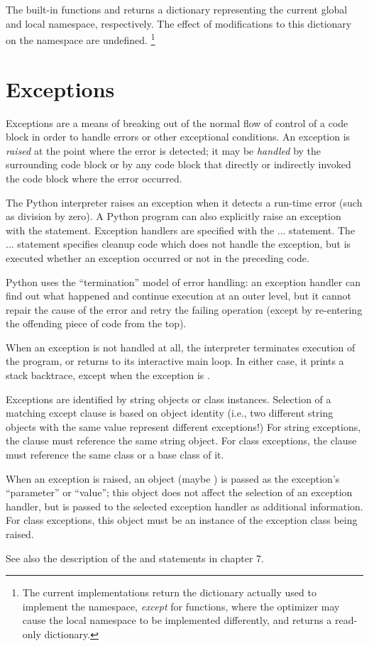 The built-in functions  and  returns a
dictionary representing the current global and local namespace,
respectively.  The effect of modifications to this dictionary on the
namespace are undefined.%
\footnote{The current implementations return the dictionary actually 
used to implement the namespace, \emph{except} for functions, where
the optimizer may cause the local namespace to be implemented
differently, and  returns a read-only dictionary.}

\section{Exceptions}

Exceptions are a means of breaking out of the normal flow of control
of a code block in order to handle errors or other exceptional
conditions.  An exception is \emph{raised} at the point where the error
is detected; it may be \emph{handled} by the surrounding code block or
by any code block that directly or indirectly invoked the code block
where the error occurred.

The Python interpreter raises an exception when it detects a run-time
error (such as division by zero).  A Python program can also
explicitly raise an exception with the  statement.
Exception handlers are specified with the  ... 
statement.  The  ...  statement
specifies cleanup code which does not handle the exception, but is
executed whether an exception occurred or not in the preceding code.

Python uses the ``termination'' model of error handling: an exception
handler can find out what happened and continue execution at an outer
level, but it cannot repair the cause of the error and retry the
failing operation (except by re-entering the offending piece of
code from the top).

When an exception is not handled at all, the interpreter terminates
execution of the program, or returns to its interactive main loop.  In
either case, it prints a stack backtrace, except when the exception is 
.

Exceptions are identified by string objects or class instances.
Selection of a matching except clause is based on object identity
(i.e., two different string objects with the same value represent
different exceptions!)  For string exceptions, the 
clause must reference the same string object.  For class exceptions,
the  clause must reference the same class or a base
class of it.

When an exception is raised, an object (maybe ) is passed
as the exception's ``parameter'' or ``value''; this object does not
affect the selection of an exception handler, but is passed to the
selected exception handler as additional information.  For class
exceptions, this object must be an instance of the exception class
being raised.

See also the description of the  and 
statements in chapter 7.
